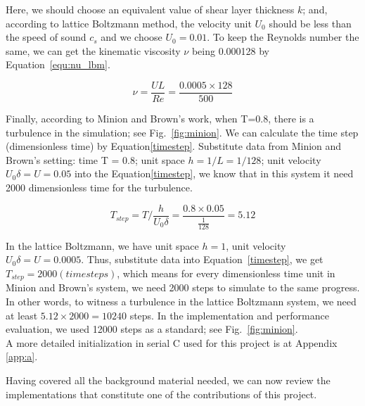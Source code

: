 Here, we should choose an equivalent value of shear layer thickness $k$; and, according to lattice Boltzmann method, the velocity unit $U_0$ should be less than the speed of sound $c_s$ and we choose $U_0 = 0.01$. To keep the Reynolds number the same, we can get the kinematic viscosity $\nu$ being 0.000128 by Equation~\ref{equ:nu_lbm}.

\begin{equation}
    \label{equ:nu_lbm}
    \nu = \frac{UL}{Re} = \frac{0.0005 \times 128}{500}  
\end{equation}

Finally, according to Minion and Brown's work, when T=0.8, there is a turbulence in the simulation; see Fig.~\ref{fig:minion}. We can calculate the time step (dimensionless time) by Equation\ref{timestep}. Substitute data from Minion and Brown's setting: time T = 0.8;  unit space $h=1/L=1/128$; unit velocity $U_0 \delta=U=0.05$  into the Equation\ref{timestep}, we know that in this system it need 2000 dimensionless time for the turbulence.

\begin{equation}
\label{timestep}
    T_{step} = T / \frac{h}{U_0 \delta} = \frac{0.8 \times 0.05}{ \frac{1}{128}}= 5.12
\end{equation}

In the lattice Boltzmann, we have unit space $h=1$, unit velocity $U_0 \delta = U = 0.0005$. Thus, substitute data into Equation~\ref{timestep}, we get $T_{step} = 2000 (timesteps)$, which means for every dimensionless time unit in Minion and Brown's system, we need 2000 steps to simulate to the same progress. In other words, to witness a turbulence in the lattice Boltzmann system, we need at least $5.12 \times 2000 = 10240$ steps. In the implementation and performance evaluation, we used 12000 steps as a standard; see Fig.~\ref{fig:minion}.\\

A more detailed initialization in serial C used for this project is at Appendix \ref{app:a}.


\vspace*{+3.2cm}
Having covered all the background material needed, we can now review the implementations that constitute one of the contributions of this project.


